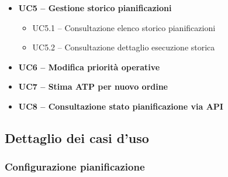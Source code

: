 \begin{itemize}
    \item \textbf{UC5 -- Gestione storico pianificazioni}
    \begin{itemize}
        \item UC5.1 -- Consultazione elenco storico pianificazioni
        \item UC5.2 -- Consultazione dettaglio esecuzione storica
    \end{itemize}

    \item \textbf{UC6 -- Modifica priorità operative}

    \item \textbf{UC7 -- Stima ATP per nuovo ordine}

    \item \textbf{UC8 -- Consultazione stato pianificazione via API}
\end{itemize}

\subsection{Dettaglio dei casi d'uso}

\subsubsection{Configurazione pianificazione}

